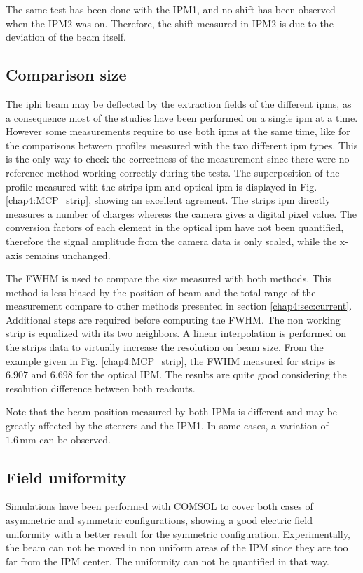 \begin{refsection}
  The same test has been done with the IPM1, and no shift has been observed when the IPM2 was on. Therefore, the shift measured in IPM2 is due to the deviation of the beam itself.

  

  \subsection{Comparison size }
  The \acrshort{iphi} beam may be deflected by the extraction fields of the different \acrshort{ipm}s, as a consequence most of the studies have been performed on a single \acrshort{ipm} at a time. However some measurements require to use both \acrshort{ipm}s at the same time, like for the comparisons between profiles measured with the two different \acrshort{ipm} types. This is the only way to check the correctness of the measurement since there were no reference method working correctly during the tests.
  The superposition of the profile measured with the strips \acrshort{ipm} and optical \acrshort{ipm} is displayed in Fig. \ref{chap4:MCP_strip}, showing an excellent agrement. The strips \acrshort{ipm} directly measures a number of charges whereas the camera gives a digital pixel value. The conversion factors of each element in the optical \acrshort{ipm} have not been quantified, therefore the signal amplitude from the camera data is only scaled, while the x-axis remains unchanged.
  

  The FWHM is used to compare the size measured with both methods. This method is less biased by the position of beam and the total range of the measurement
  compare to other methods presented in section \ref{chap4:sec:current}.
  Additional steps are required before computing the FWHM.
  The non working strip is equalized with its two neighbors. A linear interpolation is performed on the strips data to virtually increase the resolution on beam size. From the example given in Fig. \ref{chap4:MCP_strip}, the FWHM measured for strips is $6.907$ and $6.698$ for the optical IPM.
  The results are quite good considering the resolution difference between both readouts.
  
  Note that the beam position measured by both IPMs is different and may be greatly affected by the steerers and the IPM1. In some cases, a variation of $1.6\,\mathrm{mm}$ can be observed.

  \subsection{Field uniformity}
  \label{chap4:sec:field_uniformity}
  Simulations have been performed with COMSOL to cover both cases of asymmetric and symmetric configurations, showing a good electric field uniformity with a better result for the symmetric configuration. Experimentally, the beam can not be moved in non uniform areas of the IPM since they are too far from the IPM center. The uniformity can not be quantified in that way.


\end{refsection}
